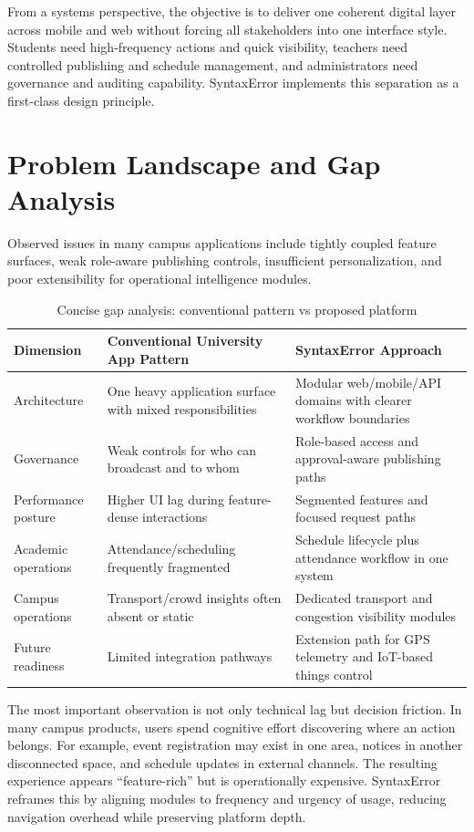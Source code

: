 \documentclass[conference]{IEEEtran}
\begin{document}
From a systems perspective, the objective is to deliver one coherent digital layer across mobile and web without forcing all stakeholders into one interface style. Students need high-frequency actions and quick visibility, teachers need controlled publishing and schedule management, and administrators need governance and auditing capability. SyntaxError implements this separation as a first-class design principle.

\section{Problem Landscape and Gap Analysis}
Observed issues in many campus applications include tightly coupled feature surfaces, weak role-aware publishing controls, insufficient personalization, and poor extensibility for operational intelligence modules.

\begin{table}[!t]
\caption{Concise gap analysis: conventional pattern vs proposed platform}
\centering
\begin{tabularx}{\textwidth}{@{}p{3.2cm}p{5.3cm}p{5.3cm}@{}}
\toprule
\textbf{Dimension} & \textbf{Conventional University App Pattern} & \textbf{SyntaxError Approach} \\
\midrule
Architecture & One heavy application surface with mixed responsibilities & Modular web/mobile/API domains with clearer workflow boundaries \\
Governance & Weak controls for who can broadcast and to whom & Role-based access and approval-aware publishing paths \\
Performance posture & Higher UI lag during feature-dense interactions & Segmented features and focused request paths \\
Academic operations & Attendance/scheduling frequently fragmented & Schedule lifecycle plus attendance workflow in one system \\
Campus operations & Transport/crowd insights often absent or static & Dedicated transport and congestion visibility modules \\
Future readiness & Limited integration pathways & Extension path for GPS telemetry and IoT-based things control \\
\bottomrule
\end{tabularx}
\label{tab:gap}
\end{table}

The most important observation is not only technical lag but decision friction. In many campus products, users spend cognitive effort discovering where an action belongs. For example, event registration may exist in one area, notices in another disconnected space, and schedule updates in external channels. The resulting experience appears ``feature-rich'' but is operationally expensive. SyntaxError reframes this by aligning modules to frequency and urgency of usage, reducing navigation overhead while preserving platform depth.
\end{document}
